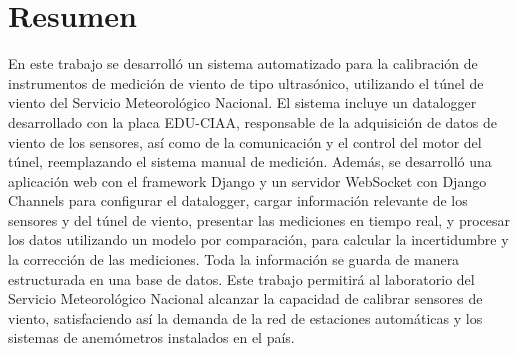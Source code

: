\chapter*{Resumen}
En este trabajo se desarrolló un sistema automatizado para la calibración de instrumentos de medición de viento de tipo ultrasónico, utilizando el túnel de viento del Servicio Meteorológico Nacional. El sistema incluye un datalogger desarrollado con la placa EDU-CIAA, responsable de la adquisición de datos de viento de los sensores, así como de la comunicación y el control del motor del túnel, reemplazando el sistema manual de medición. Además, se desarrolló una aplicación web con el framework Django y un servidor WebSocket con Django Channels  para configurar el datalogger, cargar información relevante de los sensores y del túnel de viento, presentar las mediciones en tiempo real, y procesar los datos utilizando un modelo por comparación, para calcular la incertidumbre y la corrección de las mediciones. Toda la información se guarda de manera estructurada en una base de datos. Este trabajo permitirá al laboratorio del Servicio Meteorológico Nacional alcanzar la capacidad de calibrar sensores de viento, satisfaciendo así la demanda de la red de estaciones automáticas y los sistemas de anemómetros instalados en el país.
